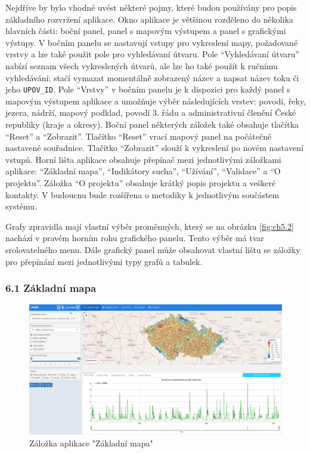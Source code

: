 \documentclass[12pt,]{article}
\begin{document}
\qquad Nejdříve by bylo vhodné uvést některé pojmy, které budou
používány pro popis základního rozvržení aplikace. Okno aplikace je
většinou rozděleno do několika hlavních části: boční panel, panel s
mapovým výstupem a panel s grafickými výstupy. V bočním panelu se
nastavují vstupy pro vykreslení mapy, požadované vrstvy a lze také
použit pole pro vyhledávaní útvaru. Pole \enquote{Vyhledávaní útvaru}
nabízí seznam všech vykreslených útvarů, ale lze ho také použít k
ručnímu vyhledávání; stačí vymazat momentálně zobrazený název a napsat
název toku či jeho \texttt{UPOV\_ID}. Pole \enquote{Vrstvy} v bočním
panelu je k dispozici pro každý panel s mapovým výstupem aplikace a
umožňuje výběr následujících vrstev: povodí, řeky, jezera, nádrží,
mapový podklad, povodí 3. řádu a administrativní členění České republiky
(kraje a okresy). Boční panel některých záložek také obsahuje tlačítka
\enquote{Reset} a \enquote{Zobrazit}. Tlačítko \enquote{Reset} vrací
mapový panel na počátečně nastavené souřadnice. Tlačítko
\enquote{Zobrazit} slouží k vykreslení po novém nastavení vstupů. Horní
lišta aplikace obsahuje přepínač mezi jednotlivými záložkami aplikace:
\enquote{Základní mapa}, \enquote{Indikátory sucha}, \enquote{Užívání},
\enquote{Validace} a \enquote{O projektu}. Záložka \enquote{O projektu}
obsahuje krátký popis projektu a veškeré kontakty. V budoucnu bude
rozšířena o metodiky k jednotlivým součástem systému.

\qquad Grafy zpravidla mají vlastní výběr proměnných, který se na
obrázku \ref{fig:ch5.2} nachází v pravém horním rohu grafického panelu.
Tento výběr má tvar srolovatelného menu. Dále grafický panel může
obsahovat vlastní lištu se záložky pro přepínání mezi jednotlivými typy
grafů a tabulek.

\subsubsection{6.1 Základní mapa}\label{zakladni-mapa}

\begin{figure}[H]
      \includegraphics[width=\textwidth]{fig/P_ZM}
      \caption{Záložka aplikace "Základní mapa"}
      \label{fig:ch5.3}
\end{figure}
\end{document}
